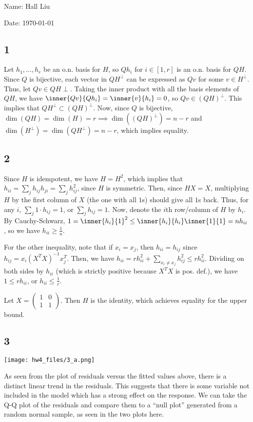 \documentclass{article}
\newcommand{\openm}{\begin{pmatrix}}
\newcommand{\closem}{\end{pmatrix}}
\begin{document}
Name: Hall Liu

Date: \today 
\vspace{1.5cm}
\subsection*{1}
Let $h_1,\ldots,h_r$ be an o.n. basis for $H$, so $Qh_i$ for $i\in[1,r]$ is an o.n. basis for $QH$. Since $Q$ is bijective, each vector in $QH^\perp$ can be expressed as $Qv$ for some $v\in H^\perp$. Thus, let $Qv\in QH\perp$. Taking the inner product with all the basis elements of $QH$, we have $\inner{Qv}{Qh_i}=\inner{v}{h_i}=0$, so $Qv\in(QH)^\perp$. This implies that $QH^\perp\subset(QH)^\perp$. Now, since $Q$ is bijective, $\dim(QH)=\dim(H)=r\implies\dim((QH)^\perp)=n-r$ and $\dim(H^\perp)=\dim(QH^\perp)=n-r$, which implies equality.
\subsection*{2}
Since $H$ is idempotent, we have $H=H^2$, which implies that $h_{ii}=\sum_jh_{ij}h_{ji}=\sum_jh_{ij}^2$, since $H$ is symmetric. Then, since $HX=X$, multiplying $H$ by the first column of $X$ (the one with all $1$s) should give all $1$s back. Thus, for any $i$, $\sum_j1\cdot h_{ij}=1$, or $\sum_j h_{ij}=1$. Now, denote the $i$th row/column of $H$ by $h_i$. By Cauchy-Schwarz, $1=\inner{h_i}{1}^2\leq\inner{h_i}{h_i}\inner{1}{1}=nh_{ii}$, so we have $h_{ii}\geq\frac{1}{n}$.

For the other inequality, note that if $x_i=x_j$, then $h_{ii}=h_{ij}$ since $h_{ij}=x_i(X^TX)^{-1}x_j^T$. Then, we have $h_{ii}=rh_{ii}^2+\sum_{x_i\neq x_j}h_{ij}^2\leq rh_{ii}^2$. Dividing on both sides by $h_{ii}$ (which is strictly positive because $X^TX$ is pos. def.), we have $1\leq rh_{ii}$, or $h_{ii}\leq\frac{1}{r}$.

Let $X=\openm1&0\\1&1\closem$. Then $H$ is the identity, which achieves equality for the upper bound. 
\subsection*{3}
\texttt{[image: hw4\_files/3\_a.png]}

As seen from the plot of residuals versus the fitted values above, there is a distinct linear trend in the residuals. This suggests that there is some variable not included in the model which has a strong effect on the response.
We can take the Q-Q plot of the residuals and compare them to a ``null plot'' generated from a random normal sample, as seen in the two plots here.
\end{document}
